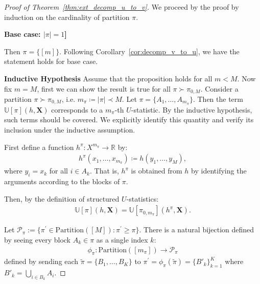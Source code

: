\documentclass[letterpaper,11pt]{article}
\newcommand{\ustat}{\mathbb{U}}
\newcommand{\partition}{\mathrm{Partition}}
\newcommand{\partitionp}[1]{\partition(#1)}
\newcommand{\pless}{\prec}
\newcommand{\pgreater}{\succ}
\begin{document}
\begin{proof}[Proof of Theorem~\ref{thm:ext_decomp_u_to_v}]
We proceed by the proof by induction on the cardinality of partition $\pi$. 

{\bf Base case: $|\pi| = 1$]}

Then $\pi = \{[m]\}$. Following Corollary~\ref{cor:decomp_v_to_u}, we have the statement holds for base case. 

{\bf Inductive Hypothesis}
Assume that the proposition holds for all $ m < M $. Now fix $ m = M $, first we can show the result is true for all $\pi \pgreater \pi_{0,M}$. Consider a partition $\pi \pgreater \pi_{0,M} $, i.e. $ m_\pi \coloneqq |\pi| \pless M $. Let $ \pi = \{A_1, \dots, A_{m_\pi}\} $. Then the term $ \ustat[\pi](h, \bm{X}) $ corresponds to a $m_\pi$-th $ U $-statistic. By the inductive hypothesis, such terms should be covered. We explicitly identify this quantity and verify its inclusion under the inductive assumption.


First define a function $h^{\pi}: X^{m_\pi} \to \mathbb{R}$ by:
\begin{align*}
    h^{\pi}(x_1, \dots, x_{m_\pi}) \coloneqq h(y_1, \dots, y_M),
\end{align*}
where $y_i = x_k$ for all $i \in A_k$. That is, $h^{\pi}$ is obtained from $h$ by identifying the arguments according to the blocks of $\pi$.

Then, by the definition of structured $U$-statistics:
\begin{align}
\label{equ:proof_u2v_part_2_equ_1}
    \ustat[\pi](h, \bm{X}) = \ustat[\pi_{0, m_\pi}](h^{\pi}, \bm{X}).
\end{align}

Let $\mathcal{P}_\pi := \{ \pi^{\prime} \in \partitionp{[M]} : \pi^{\prime} \geq \pi \}$. There is a natural bijection defined by seeing every block $A_k \in \pi$ as a single index $k$:
\begin{align*}
    \phi_{\pi}: \partitionp{[m_\pi]} \to \mathcal{P}_\pi
\end{align*}
defined by sending each $\tilde{\pi} = \{B_1, \dots, B_K\}$ to $\pi^{\prime} = \phi_{\pi}(\tilde{\pi}) = \{ B'_k \}_{k=1}^K$ where $B'_k = \bigcup_{i \in B_k} A_i$.  


\end{proof}
\end{document}
